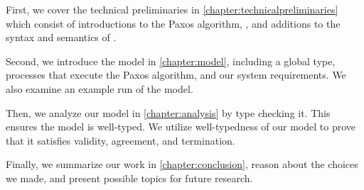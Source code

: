 First, we cover the technical preliminaries in \autoref{chapter:technicalpreliminaries} which consist of introductions to the Paxos algorithm, \FTMPST, and additions to the syntax and semantics of \FTMPST.

Second, we introduce the model in \autoref{chapter:model}, including a global type, processes that execute the Paxos algorithm, and our system requirements.
We also examine an example run of the model.

Then, we analyze our model in \autoref{chapter:analysis} by type checking it.
This ensures the model is well-typed.
We utilize well-typedness of our model to prove that it satisfies validity, agreement, and termination.

Finally, we summarize our work in \autoref{chapter:conclusion}, reason about the choices we made, and present possible topics for future research.
